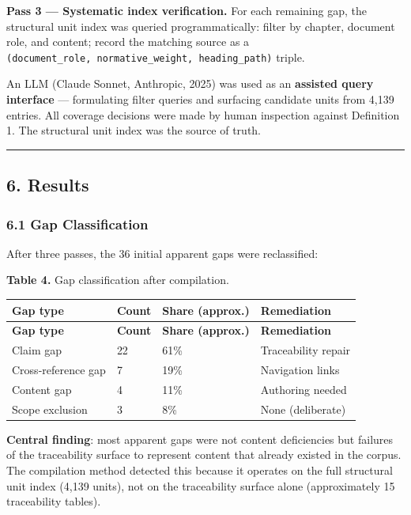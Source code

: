 \documentclass[
]{article}
\begin{document}
\textbf{Pass 3 --- Systematic index verification.} For each remaining
gap, the structural unit index was queried programmatically: filter by
chapter, document role, and content; record the matching source as a
\texttt{(document\_role,\ normative\_weight,\ heading\_path)} triple.

An LLM (Claude Sonnet, Anthropic, 2025) was used as an \textbf{assisted
query interface} --- formulating filter queries and surfacing candidate
units from 4,139 entries. All coverage decisions were made by human
inspection against Definition 1. The structural unit index was the
source of truth.

\begin{center}\rule{0.5\linewidth}{0.5pt}\end{center}

\subsection{6. Results}\label{results}

\subsubsection{6.1 Gap Classification}\label{gap-classification}

After three passes, the 36 initial apparent gaps were reclassified:

\textbf{Table 4.} Gap classification after compilation.

\begin{longtable}{@{}L{3.35cm}R{1.5cm}R{1.8cm}L{5.15cm}@{}}
\toprule
\textbf{Gap type} & \textbf{Count} & \textbf{Share (approx.)} & \textbf{Remediation} \\
\midrule
\endfirsthead
\toprule
\textbf{Gap type} & \textbf{Count} & \textbf{Share (approx.)} & \textbf{Remediation} \\
\midrule
\endhead
\bottomrule
\endfoot
\bottomrule
\endlastfoot
Claim gap & 22 & 61\% & Traceability repair \\
Cross-reference gap & 7 & 19\% & Navigation links \\
Content gap & 4 & 11\% & Authoring needed \\
Scope exclusion & 3 & 8\% & None (deliberate) \\
\end{longtable}

\textbf{Central finding}: most apparent gaps were not content
deficiencies but failures of the traceability surface to represent
content that already existed in the corpus. The compilation method
detected this because it operates on the full structural unit index
(4,139 units), not on the traceability surface alone (approximately 15
traceability tables).
\end{document}
